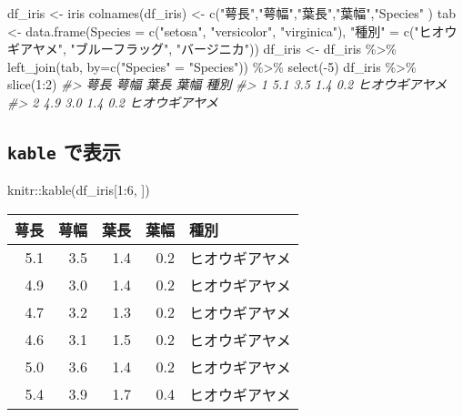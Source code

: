 \documentclass[
]{bxjsbook}
\newenvironment{Shaded}{\begin{snugshade}}{\end{snugshade}}
\newcommand{\AttributeTok}[1]{\textcolor[rgb]{0.77,0.63,0.00}{#1}}
\newcommand{\CommentTok}[1]{\textcolor[rgb]{0.56,0.35,0.01}{\textit{#1}}}
\newcommand{\DecValTok}[1]{\textcolor[rgb]{0.00,0.00,0.81}{#1}}
\newcommand{\FunctionTok}[1]{\textcolor[rgb]{0.00,0.00,0.00}{#1}}
\newcommand{\NormalTok}[1]{#1}
\newcommand{\OtherTok}[1]{\textcolor[rgb]{0.56,0.35,0.01}{#1}}
\newcommand{\SpecialCharTok}[1]{\textcolor[rgb]{0.00,0.00,0.00}{#1}}
\newcommand{\StringTok}[1]{\textcolor[rgb]{0.31,0.60,0.02}{#1}}
\theoremstyle{definition}
\theoremstyle{definition}
\theoremstyle{definition}
\theoremstyle{definition}
\theoremstyle{remark}
\begin{document}
\begin{Shaded}
\begin{Highlighting}[]
\NormalTok{df\_iris }\OtherTok{\textless{}{-}}\NormalTok{ iris}
\FunctionTok{colnames}\NormalTok{(df\_iris) }\OtherTok{\textless{}{-}} \FunctionTok{c}\NormalTok{(}\StringTok{"萼長"}\NormalTok{,}\StringTok{"萼幅"}\NormalTok{,}\StringTok{"葉長"}\NormalTok{,}\StringTok{"葉幅"}\NormalTok{,}\StringTok{"Species"}\NormalTok{ )}
\NormalTok{tab }\OtherTok{\textless{}{-}} \FunctionTok{data.frame}\NormalTok{(}\AttributeTok{Species =} \FunctionTok{c}\NormalTok{(}\StringTok{"setosa"}\NormalTok{, }\StringTok{"versicolor"}\NormalTok{, }\StringTok{"virginica"}\NormalTok{), }
                  \StringTok{"種別"} \OtherTok{=} \FunctionTok{c}\NormalTok{(}\StringTok{"ヒオウギアヤメ"}\NormalTok{, }\StringTok{"ブルーフラッグ"}\NormalTok{, }\StringTok{"バージニカ"}\NormalTok{))}
\NormalTok{df\_iris }\OtherTok{\textless{}{-}}\NormalTok{ df\_iris }\SpecialCharTok{\%\textgreater{}\%} \FunctionTok{left\_join}\NormalTok{(tab, }\AttributeTok{by=}\FunctionTok{c}\NormalTok{(}\StringTok{"Species"} \OtherTok{=} \StringTok{"Species"}\NormalTok{)) }\SpecialCharTok{\%\textgreater{}\%} \FunctionTok{select}\NormalTok{(}\SpecialCharTok{{-}}\DecValTok{5}\NormalTok{)}
\NormalTok{df\_iris }\SpecialCharTok{\%\textgreater{}\%} \FunctionTok{slice}\NormalTok{(}\DecValTok{1}\SpecialCharTok{:}\DecValTok{2}\NormalTok{)}
\CommentTok{\#\textgreater{}   萼長 萼幅 葉長 葉幅           種別}
\CommentTok{\#\textgreater{} 1  5.1  3.5  1.4  0.2 ヒオウギアヤメ}
\CommentTok{\#\textgreater{} 2  4.9  3.0  1.4  0.2 ヒオウギアヤメ}
\end{Highlighting}
\end{Shaded}

\hypertarget{kable-ux3067ux8868ux793a}{%
\subsection{\texorpdfstring{\texttt{kable} で表示}{kable で表示}}\label{kable-ux3067ux8868ux793a}}

\begin{Shaded}
\begin{Highlighting}[]
\NormalTok{knitr}\SpecialCharTok{::}\FunctionTok{kable}\NormalTok{(df\_iris[}\DecValTok{1}\SpecialCharTok{:}\DecValTok{6}\NormalTok{, ])}
\end{Highlighting}
\end{Shaded}

\begin{tabular}{r|r|r|r|l}
\hline
萼長 & 萼幅 & 葉長 & 葉幅 & 種別\\
\hline
5.1 & 3.5 & 1.4 & 0.2 & ヒオウギアヤメ\\
\hline
4.9 & 3.0 & 1.4 & 0.2 & ヒオウギアヤメ\\
\hline
4.7 & 3.2 & 1.3 & 0.2 & ヒオウギアヤメ\\
\hline
4.6 & 3.1 & 1.5 & 0.2 & ヒオウギアヤメ\\
\hline
5.0 & 3.6 & 1.4 & 0.2 & ヒオウギアヤメ\\
\hline
5.4 & 3.9 & 1.7 & 0.4 & ヒオウギアヤメ\\
\hline
\end{tabular}
\end{document}
